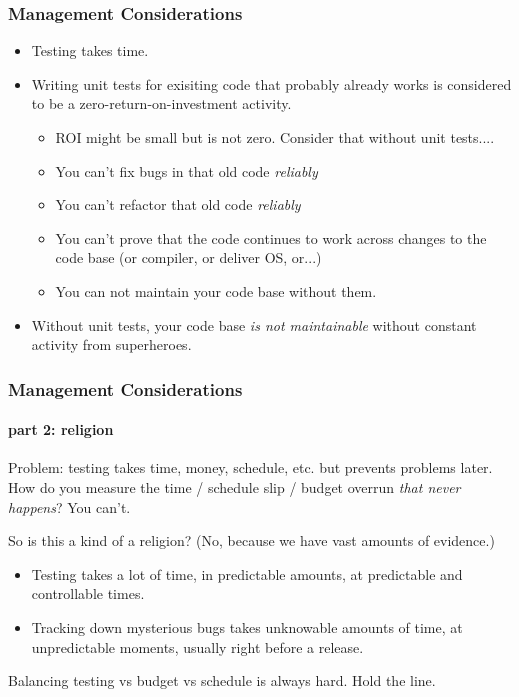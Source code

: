 \begin{frame}[fragile,t]
\frametitle{Management Considerations}
\begin{itemize}
  \item Testing takes time.
  \item Writing unit tests for exisiting code that
    probably already works is  considered to be a
    zero-return-on-investment activity.
    \begin{itemize}
      \item ROI might be small but is not
        zero. Consider that without unit tests....
      \item You can't fix bugs in that old code \emph{reliably} 
      \item You can't refactor that old code \emph{reliably}
      \item You can't prove that the code continues to work across
        changes to the code base (or compiler, or deliver OS, or...)
        \item You can not  maintain your code base without them.
    \end{itemize}
  \item Without unit tests, your code base \emph{is not maintainable}
    without constant activity from superheroes.
\end{itemize}
\end{frame}

\begin{frame}[fragile,t]
\frametitle{Management Considerations}
\framesubtitle{part 2: religion}


Problem: testing takes time, money, schedule, etc. but
prevents problems later.  How do you measure the time / schedule slip
/ budget overrun \emph{that never happens}?  
\vskip 6pt
You can't.
\vskip 6pt

So is this a kind of a religion?  (No, because we have vast amounts of
evidence.)

\begin{itemize}

\item Testing takes a lot of time, in predictable amounts, at predictable
and controllable times.

\item Tracking down mysterious bugs takes unknowable amounts of time,
  at unpredictable moments, usually right before a release.

\end{itemize}

Balancing testing vs budget vs schedule is always hard.  Hold the line.

\end{frame}


